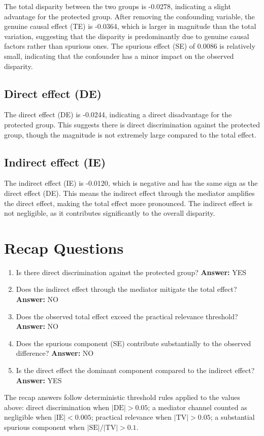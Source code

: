 \documentclass[11pt]{article}
\begin{document}
The total disparity between the two groups is -0.0278, indicating a slight advantage for the protected group. After removing the confounding variable, the genuine causal effect (TE) is -0.0364, which is larger in magnitude than the total variation, suggesting that the disparity is predominantly due to genuine causal factors rather than spurious ones. The spurious effect (SE) of 0.0086 is relatively small, indicating that the confounder has a minor impact on the observed disparity.

\subsection{Direct effect (DE)}

The direct effect (DE) is -0.0244, indicating a direct disadvantage for the protected group. This suggests there is direct discrimination against the protected group, though the magnitude is not extremely large compared to the total effect.

\subsection{Indirect effect (IE)}

The indirect effect (IE) is -0.0120, which is negative and has the same sign as the direct effect (DE). This means the indirect effect through the mediator amplifies the direct effect, making the total effect more pronounced. The indirect effect is not negligible, as it contributes significantly to the overall disparity.

\section{Recap Questions}

\begin{enumerate}
\item Is there direct discrimination against the protected group? \textbf{Answer:} YES
\item Does the indirect effect through the mediator mitigate the total effect? \textbf{Answer:} NO
\item Does the observed total effect exceed the practical relevance threshold? \textbf{Answer:} NO
\item Does the spurious component (SE) contribute substantially to the observed difference? \textbf{Answer:} NO
\item Is the direct effect the dominant component compared to the indirect effect? \textbf{Answer:} YES
\end{enumerate}

\vspace{1em}
\noindent\footnotesize
The recap answers follow deterministic threshold rules applied to the values above: direct discrimination when $|\mathrm{DE}| > 0.05$; a mediator channel counted as negligible when $|\mathrm{IE}| < 0.005$; practical relevance when $|\mathrm{TV}| > 0.05$; a substantial spurious component when $|\mathrm{SE}| / |\mathrm{TV}| > 0.1$.
\end{document}

